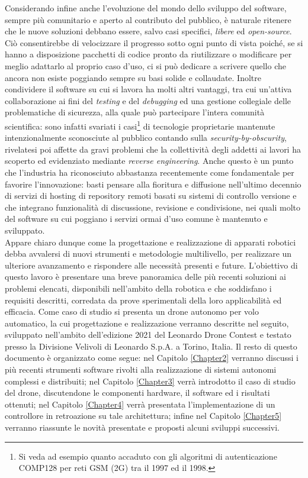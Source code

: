 Considerando infine anche l'evoluzione del mondo dello sviluppo del software, sempre più comunitario e aperto al contributo del pubblico, è naturale ritenere che le nuove soluzioni debbano essere, salvo casi specifici, \emph{libere} ed \emph{open-source}. Ciò consentirebbe di velocizzare il progresso sotto ogni punto di vista poiché, se si hanno a disposizione pacchetti di codice pronto da riutilizzare o modificare per meglio adattarlo al proprio caso d'uso, ci si può dedicare a scrivere quello che ancora non esiste poggiando sempre su basi solide e collaudate. Inoltre condividere il software su cui si lavora ha molti altri vantaggi, tra cui un'attiva collaborazione ai fini del \emph{testing} e del \emph{debugging} ed una gestione collegiale delle problematiche di sicurezza, alla quale può partecipare l'intera comunità scientifica: sono infatti svariati i casi\footnote{Si veda ad esempio quanto accaduto con gli algoritmi di autenticazione COMP128 per reti GSM (2G) tra il 1997 ed il 1998.} di tecnologie proprietarie mantenute intenzionalmente sconosciute al pubblico contando sulla \emph{security-by-obscurity}, rivelatesi poi affette da gravi problemi che la collettività degli addetti ai lavori ha scoperto ed evidenziato mediante \emph{reverse engineering}. Anche questo è un punto che l'industria ha riconosciuto abbastanza recentemente come fondamentale per favorire l'innovazione: basti pensare alla fioritura e diffusione nell'ultimo decennio di servizi di hosting di repository remoti basati su sistemi di controllo versione e che integrano funzionalità di discussione, revisione e condivisione, nei quali molto del software su cui poggiano i servizi ormai d'uso comune è mantenuto e sviluppato.\\
Appare chiaro dunque come la progettazione e realizzazione di apparati robotici debba avvalersi di nuovi strumenti e metodologie multilivello, per realizzare un ulteriore avanzamento e rispondere alle necessità presenti e future. L'obiettivo di questo lavoro è presentare una breve panoramica delle più recenti soluzioni ai problemi elencati, disponibili nell'ambito della robotica e che soddisfano i requisiti descritti, corredata da prove sperimentali della loro applicabilità ed efficacia. Come caso di studio si presenta un drone autonomo per volo automatico, la cui progettazione e realizzazione verranno descritte nel seguito, sviluppato nell'ambito dell'edizione 2021 del Leonardo Drone Contest e testato presso la Divisione Velivoli di Leonardo S.p.A. a Torino, Italia.\newpage
Il resto di questo documento è organizzato come segue: nel Capitolo \ref{Chapter2} verranno discussi i più recenti strumenti software rivolti alla realizzazione di sistemi autonomi complessi e distribuiti; nel Capitolo \ref{Chapter3} verrà introdotto il caso di studio del drone, discutendone le componenti hardware, il software ed i risultati ottenuti; nel Capitolo \ref{Chapter4} verrà presentata l'implementazione di un controllore in retroazione su tale architettura; infine nel Capitolo \ref{Chapter5} verranno riassunte le novità presentate e proposti alcuni sviluppi successivi.